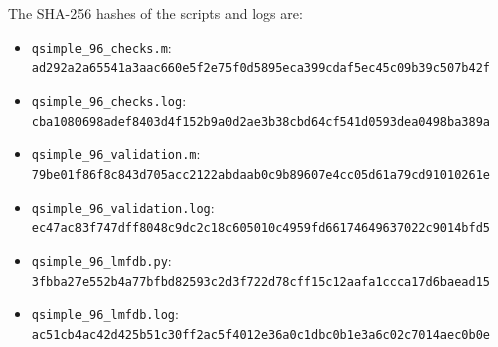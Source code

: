 \documentclass[11pt]{article}
\begin{document}
The SHA-256 hashes of the scripts and logs are:
\begin{itemize}
\item \texttt{qsimple\_96\_checks.m}: \texttt{ad292a2a\allowbreak 65541a3a\allowbreak ac660e5f\allowbreak 2e75f0d5\allowbreak 895eca39\allowbreak 9cdaf5ec\allowbreak 45c09b39\allowbreak c507b42f}
\item \texttt{qsimple\_96\_checks.log}: \texttt{cba10806\allowbreak 98adef84\allowbreak 03d4f152\allowbreak b9a0d2ae\allowbreak 3b38cbd6\allowbreak 4cf541d0\allowbreak 593dea04\allowbreak 98ba389a}
\item \texttt{qsimple\_96\_validation.m}: \texttt{79be01f8\allowbreak 6f8c843d\allowbreak 705acc21\allowbreak 22abdaab\allowbreak 0c9b8960\allowbreak 7e4cc05d\allowbreak 61a79cd9\allowbreak 1010261e}
\item \texttt{qsimple\_96\_validation.log}: \texttt{ec47ac83\allowbreak f747dff8\allowbreak 048c9dc2\allowbreak c18c6050\allowbreak 10c4959f\allowbreak d6617464\allowbreak 9637022c\allowbreak 9014bfd5}
\item \texttt{qsimple\_96\_lmfdb.py}: \texttt{3fbba27e\allowbreak 552b4a77\allowbreak bfbd8259\allowbreak 3c2d3f72\allowbreak 2d78cff1\allowbreak 5c12aafa\allowbreak 1ccca17d\allowbreak 6baead15}
\item \texttt{qsimple\_96\_lmfdb.log}: \texttt{ac51cb4a\allowbreak c42d425b\allowbreak 51c30ff2\allowbreak ac5f4012\allowbreak e36a0c1d\allowbreak bc0b1e3a\allowbreak 6c02c701\allowbreak 4aec0b0e}
\end{itemize}
\end{document}

